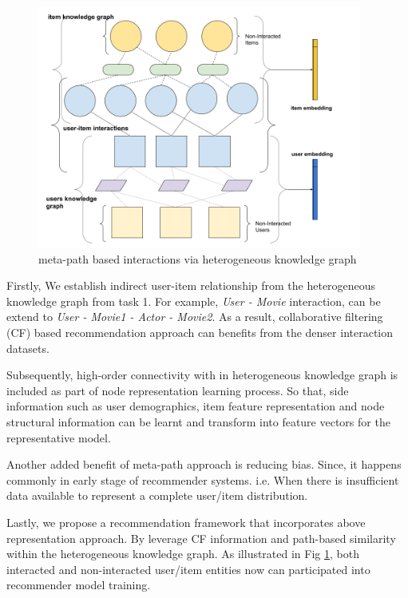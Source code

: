 \begin{figure}[!t]
    \centering
    \includegraphics[width=0.95\textwidth]{figs/meta-embedding.png}
    \caption{meta-path based interactions via heterogeneous knowledge graph}\label{fig:meta_task2}
\end{figure}

Firstly, We establish indirect user-item relationship from the heterogeneous knowledge graph from task 1. For example, \textit{User - Movie} interaction, can be extend to \textit{User - Movie1 - Actor - Movie2}. As a result, collaborative filtering (CF) based recommendation approach can benefits from the denser interaction datasets. 

Subsequently, high-order connectivity with in heterogeneous knowledge graph is included as part of node representation learning process. So that, side information such as user demographics, item feature representation and node structural information can be learnt and transform into feature vectors for the representative model. 

Another added benefit of meta-path approach is reducing bias. Since, it happens commonly in early stage of recommender systems. i.e. When there is insufficient data available to represent a complete user/item distribution. 

Lastly, we propose a recommendation framework that incorporates above representation approach. By leverage CF information and path-based similarity within the heterogeneous knowledge graph. As illustrated in Fig \ref{fig:meta_task2}, both interacted and non-interacted user/item entities now can participated into recommender model training.

